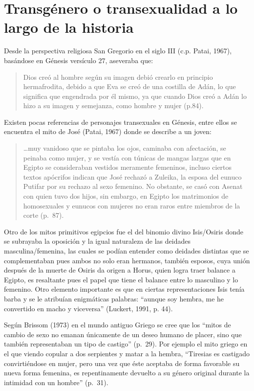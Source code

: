 \section{Transgénero o transexualidad a lo largo de la historia}
Desde la perspectiva religiosa San Gregorio en el siglo III (c.p.
Patai, 1967), basándose en Génesis versículo 27, aseveraba que:

\begin{quote}
    Dios creó al hombre según su imagen debió crearlo en principio hermafrodita,
    debido a que Eva se creó de una costilla de Adán, lo que significa que
    engendrada por él mismo, ya que cuando Dios creó a Adán lo hizo a su imagen y
    semejanza, como hombre y mujer (p.84).
\end{quote}

Existen pocas referencias de personajes transexuales en Génesis, entre ellos
se encuentra el mito de José (Patai, 1967) donde se describe a un joven:

\begin{quote}
    …muy vanidoso que se pintaba los ojos, caminaba con afectación, se peinaba como
    mujer, y se vestía con túnicas de mangas largas que en Egipto se consideraban
    vestidos meramente femeninos, incluso ciertos textos apócrifos indican que José
    rechazó a Zuleika, la esposa del eunuco Putifar por su rechazo al sexo femenino.
    No obstante, se casó con Asenat con quien tuvo dos hijos, sin embargo, en Egipto
    los matrimonios de homosexuales y eunucos con mujeres no eran raros entre
    miembros de la corte (p.~87).
\end{quote}

Otro de los mitos primitivos egipcios fue el del binomio divino Isis/Osiris
donde se subrayaba la oposición y la igual naturaleza de las deidades
masculina/femenina, las cuales se podían entender como deidades distintas que se
complementaban pues ambos no solo eran hermanos, también esposos, cuya unión
después de la muerte de Osiris da origen a Horus, quien logra traer balance a
Egipto, es resaltante pues el papel que tiene el balance entre lo masculino y lo
femenino.
Otro elemento importante es que en ciertas representaciones Isis tenía barba y
se le atribuían enigmáticas palabras: “aunque soy hembra, me he convertido en
macho y viceversa” (Luckert, 1991, p. 44).

Según Brissom (1973) en el mundo antiguo Griego se cree que los “mitos de cambio
de sexo no emanan únicamente de un deseo humano de placer, sino que también
representaban un tipo de castigo” (p.~29).
Por ejemplo el mito griego en el que viendo copular a dos serpientes y matar
a la hembra, “Tiresias es castigado convirtiéndose en mujer, pero una vez que
éste aceptaba de forma favorable su nueva forma femenina, es repentinamente
devuelto a su género original durante la intimidad con un hombre” (p.~31).

